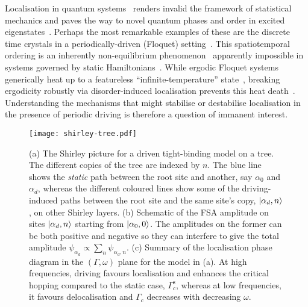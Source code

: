 \documentclass[aps,prl,twocolumn,superscriptaddress,nobalancelastpage,longbibliography]{revtex4-2}
\begin{document}
Localisation in quantum systems~\cite{anderson1958absence,basko2006metal,gornyi2005interacting,oganesyan2007localisation,znidaric2008many,nandkishore2015many} renders invalid the framework of statistical mechanics and paves the way to novel quantum phases and order in excited eigenstates~\cite{huse2013localisation}. Perhaps the most remarkable examples of these are the discrete time crystals in a periodically-driven (Floquet) setting~\cite{khemani2016phase,else2016floquet,yao2017discrete,moessner2017equilibration}. This spatiotemporal ordering is an inherently non-equilibrium phenomenon~\cite{watanabe2015absence} apparently impossible in systems governed by static Hamiltonians~\cite{khemani2019brief}. While ergodic Floquet systems generically heat up to a featureless ``infinite-temperature'' state~\cite{lazarides2014equilibrium,dalessio2014long}, breaking ergodicity robustly via disorder-induced localisation prevents this heat death~\cite{ponte2015many,lazarides2015fate,ponte2015periodically,abanin2016theory}. Understanding the mechanisms that might stabilise or destabilise localisation in the presence of periodic driving is therefore a question of immanent interest.



\begin{figure}
\texttt{[image: shirley-tree.pdf]}
\caption{(a) The Shirley picture for a driven tight-binding model on a tree. The different copies of the tree are indexed by $n$. The blue line shows the \emph{static} path between the root site and another, say $\alpha_0$ and $\alpha_d$, whereas the different coloured lines show some of the driving-induced paths between the root site and the same site's copy, $\ket{\alpha_d,n}$, on other Shirley layers. (b) Schematic of the FSA amplitude on sites $\ket{\alpha_d,n}$ starting from $\ket{\alpha_0,0}$. The amplitudes on the former can be both positive and negative so they can interfere to give the total amplitude $\psi_{\alpha_d}\propto\sum_{n}\psi_{\alpha_d,n}$.  (c) Summary of the localisation phase diagram in the $(\Gamma,\omega)$ plane for the model in (a). At high frequencies, driving favours localisation and enhances the critical hopping compared to the static case, $\Gamma_c^\mathrm{s}$, whereas at low frequencies, it favours delocalisation and $\Gamma_c$ decreases with decreasing $\omega$.}
\label{fig:shirley}
\end{figure}
\end{document}
